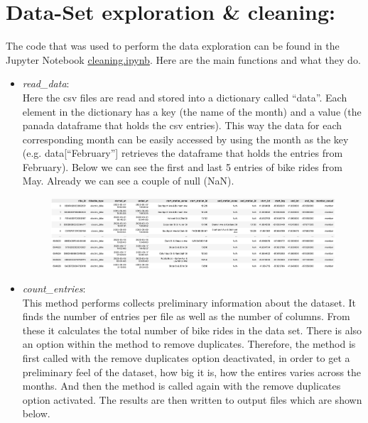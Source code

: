 \documentclass[12pt]{article}
\begin{document}
\section*{Data-Set exploration \& cleaning:}
The code that was used to perform the data exploration can be found in the Jupyter Notebook \href{https://github.com/SummerKassem/BikeShareCS/blob/main/Code/cleaning.ipynb}{cleaning.ipynb}. Here are the main functions and what they do.
\begin{itemize}
	\item \textit{read\_data}:\\
	Here the csv files are read and stored into a dictionary called “data”. Each element in the dictionary has a key (the name of the month) and a value (the panada dataframe that holds the csv entries). This way the data for each corresponding month can be easily accessed by using the month as the key (e.g. data[“February”] retrieves the dataframe that holds the entries from February). Below we can see the first and last 5 entries of bike rides from May. Already we can see a couple of null (NaN).

	\begin{figure}[h]
	\hspace{-1.8cm}
	\includegraphics[width=8 in, height = 2 in]{imgMay.png}
	\end{figure}
	\pagebreak
	
	\item \textit{count\_entries}:\\
	This method performs collects preliminary information about the dataset. It finds the number of entries per file as well as the number of columns. From these it calculates the total number of bike rides in the data set. There is also an option within the method to remove duplicates. Therefore, the method is first called with the remove duplicates option deactivated, in order to get a preliminary feel of the dataset, how big it is, how the entires varies across the months. And then the method is called again with the remove duplicates option activated. The results are then written to output files which are shown below. 
	

\end{itemize}
\end{document}
